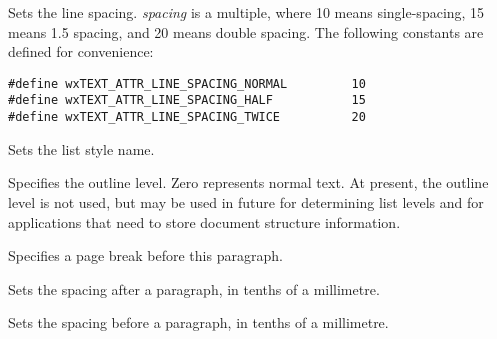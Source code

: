 
Sets the line spacing. {\it spacing} is a multiple, where 10 means single-spacing,
15 means 1.5 spacing, and 20 means double spacing. The following constants are
defined for convenience:

{\small
\begin{verbatim}
#define wxTEXT_ATTR_LINE_SPACING_NORMAL         10
#define wxTEXT_ATTR_LINE_SPACING_HALF           15
#define wxTEXT_ATTR_LINE_SPACING_TWICE          20
\end{verbatim}
}

\label{wxrichtextattrsetliststylename}


Sets the list style name.

\label{wxrichtextattrsetoutlinelevel}


Specifies the outline level. Zero represents normal text. At present, the outline level is
not used, but may be used in future for determining list levels and for applications
that need to store document structure information.

\label{wxrichtextattrsetpagebreak}


Specifies a page break before this paragraph.

\label{wxrichtextattrsetparagraphspacingafter}


Sets the spacing after a paragraph, in tenths of a millimetre.

\label{wxrichtextattrsetparagraphspacingbefore}


Sets the spacing before a paragraph, in tenths of a millimetre.

\label{wxrichtextattrsetparagraphstylename}


